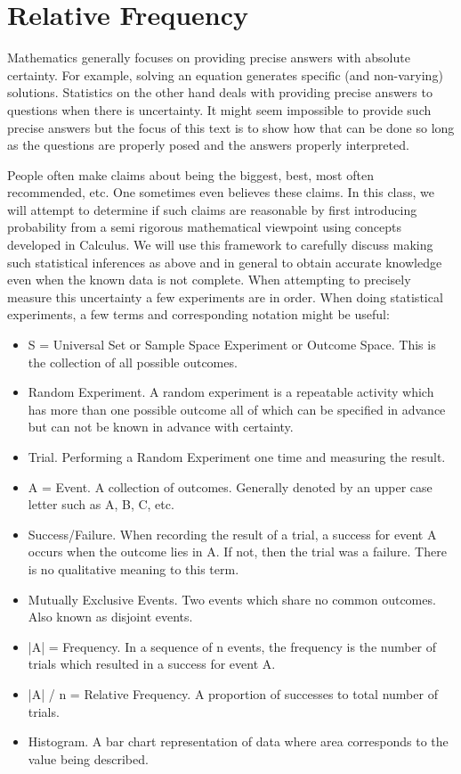\documentclass[10pt,]{book}
\theoremstyle{plain}
\theoremstyle{definition}
\theoremstyle{definition}
\theoremstyle{definition}
\numberwithin{equation}{section}
\begin{document}
\section[Relative Frequency]{Relative Frequency}\label{RelativeFrequency}
\typeout{************************************************}
\typeout{************************************************}
Mathematics generally focuses on providing precise answers with absolute certainty. For example, solving an equation generates specific (and non-varying) solutions. Statistics on the other hand deals with providing precise answers to questions when there is uncertainty. It might seem impossible to provide such precise answers but the focus of this text is to show how that can be done so long as the questions are properly posed and the answers properly interpreted.%
\par
People often make claims about being the biggest, best, most often recommended, etc. One sometimes even believes these claims. In this class, we will attempt to determine if such claims are reasonable by first introducing probability from a semi rigorous mathematical viewpoint using concepts developed in Calculus. We will use this framework to carefully discuss making such statistical inferences as above and in general to obtain accurate knowledge even when the known data is not complete. %
When attempting to precisely measure this uncertainty a few experiments are in order. When doing statistical experiments, a few terms and corresponding notation might be useful:%
\leavevmode%
\begin{itemize}[label=\textbullet]
\item{}S = Universal Set or Sample Space Experiment or Outcome Space. 
		This is the collection of all possible outcomes.%
\item{}Random Experiment. A random experiment is a repeatable activity which has more than one
		possible outcome all of which can be specified in advance but can not be known in advance with certainty.%
\item{}Trial. Performing a Random Experiment one time and measuring the result.%
\item{}A = Event. A collection of outcomes.  Generally denoted by an upper case letter such as A, B, C, etc.%
\item{}Success/Failure. When recording the result of a trial, a success for event A occurs when the outcome
		lies in A. If not, then the trial was a failure. There is no qualitative meaning to this term.%
\item{}Mutually Exclusive Events. Two events which share no common outcomes. Also known as disjoint events.%
\item{}|A| = Frequency. In a sequence of n events, the frequency is the number of trials which resulted in 
		a success for event A.%
\item{}|A| / n = Relative Frequency. A proportion of successes to total number of trials.%
\item{}Histogram. A bar chart representation of data where area corresponds to the value being described.%
\end{itemize}
\end{document}
